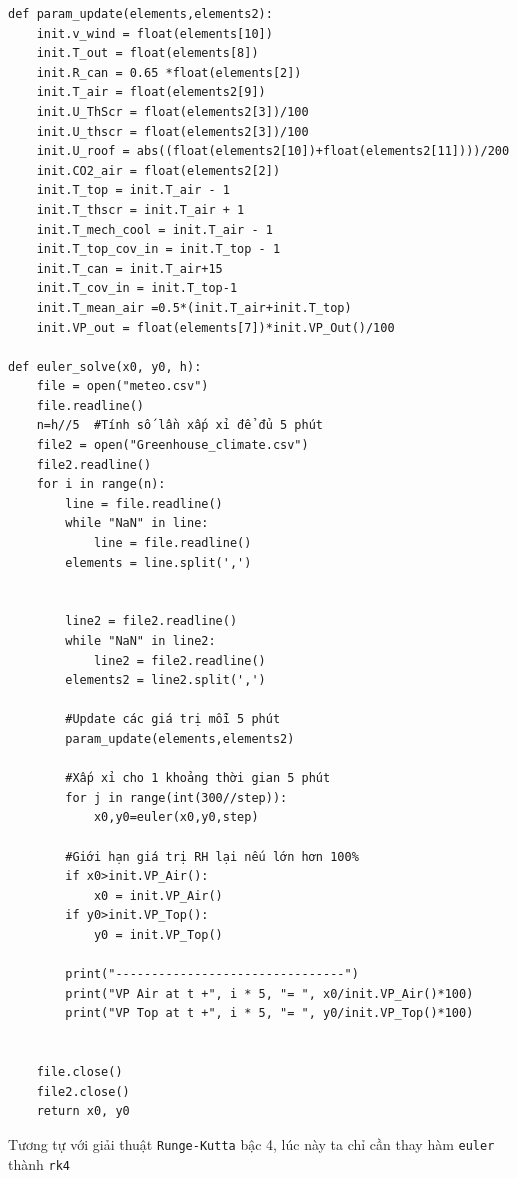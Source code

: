 \documentclass[a4paper]{article}
\begin{document}
\begin{verbatim}
def param_update(elements,elements2):
    init.v_wind = float(elements[10])
    init.T_out = float(elements[8])
    init.R_can = 0.65 *float(elements[2])
    init.T_air = float(elements2[9])
    init.U_ThScr = float(elements2[3])/100
    init.U_thscr = float(elements2[3])/100
    init.U_roof = abs((float(elements2[10])+float(elements2[11])))/200
    init.CO2_air = float(elements2[2])
    init.T_top = init.T_air - 1
    init.T_thscr = init.T_air + 1
    init.T_mech_cool = init.T_air - 1
    init.T_top_cov_in = init.T_top - 1
    init.T_can = init.T_air+15
    init.T_cov_in = init.T_top-1
    init.T_mean_air =0.5*(init.T_air+init.T_top)
    init.VP_out = float(elements[7])*init.VP_Out()/100

def euler_solve(x0, y0, h):
    file = open("meteo.csv")                
    file.readline()
    n=h//5  #Tính số lần xấp xỉ để đủ 5 phút
    file2 = open("Greenhouse_climate.csv")
    file2.readline()
    for i in range(n):
        line = file.readline()
        while "NaN" in line:
            line = file.readline()
        elements = line.split(',')


        line2 = file2.readline()
        while "NaN" in line2:
            line2 = file2.readline()
        elements2 = line2.split(',')

        #Update các giá trị mỗi 5 phút
        param_update(elements,elements2)
        
        #Xấp xỉ cho 1 khoảng thời gian 5 phút
        for j in range(int(300//step)):
            x0,y0=euler(x0,y0,step)

        #Giới hạn giá trị RH lại nếu lớn hơn 100%
        if x0>init.VP_Air():
            x0 = init.VP_Air()
        if y0>init.VP_Top():
            y0 = init.VP_Top()

        print("--------------------------------")
        print("VP Air at t +", i * 5, "= ", x0/init.VP_Air()*100)
        print("VP Top at t +", i * 5, "= ", y0/init.VP_Top()*100)


    file.close()
    file2.close()
    return x0, y0
\end{verbatim}

Tương tự với giải thuật \texttt{Runge-Kutta} bậc 4, lúc này ta chỉ cần thay hàm \texttt{euler} thành \texttt{rk4}
\end{document}
